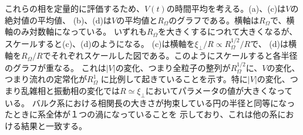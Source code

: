 \documentclass[/Users/ikedahajime/GitHub/reserch/master_report/thesis]{subfiles}
\begin{document}
これらの相を定量的に評価するため、$V(t)$の時間平均を考える。(a)、(c)は$V$の絶対値の平均値、
(b)、(d)は$V$の平均値と$R_\Omega$のグラフである。横軸は$R_{\Omega}$で、横軸のみ対数軸になっている。
いずれも$R_\Omega$を大きくするにつれて大きくなるが、スケールすると(c)、(d)のようになる。
(c)は横軸を$\xi_\bot/R \propto R_\Omega^{1/2}/R$\cite{kurodaLongrangeTranslationalOrder2024}で、
(d)は横軸を$R_\Omega/R$でそれぞれスケールした図である。このようにスケールすると各半径のグラフが重なる。
これは$|V|$の変化、つまり全粒子の整列が$R_\Omega^{1/2}$に、$V$の変化、つまり流れの定常化が$R_\Omega^1$
に比例して起きていることを示す。特に$|V|$の変化、つまり乱雑相と振動相の変化では$R\simeq\xi_\bot$においてパラメータの値が大きくなっている。
バルク系における相関長の大きさが拘束している円の半径と同等になったときに系全体が１つの渦になっていることを
示しており、これは他の系における結果と一致する。\\%
\end{document}
